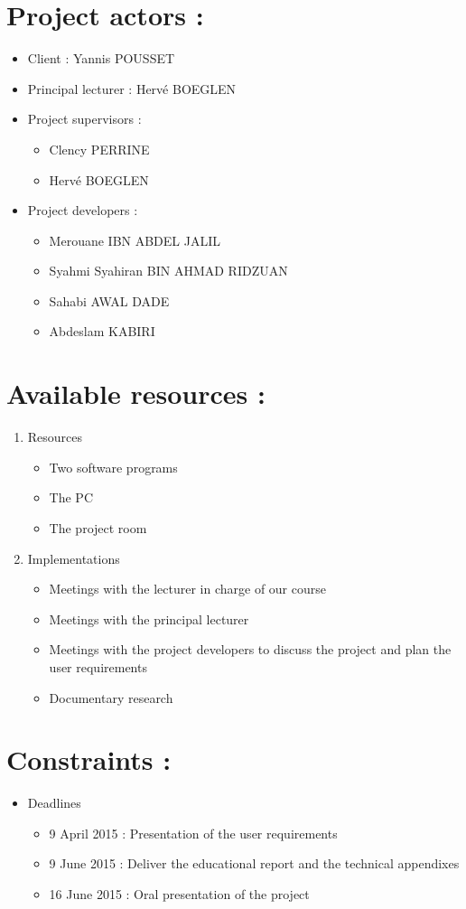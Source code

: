 \documentclass[12pt,a4paper]{article}
\begin{document}
\section{Project actors :}
\begin{itemize}
\item Client : Yannis POUSSET
\item Principal lecturer : Herv\'e BOEGLEN
\item Project supervisors :
	\begin{itemize}
	\item Clency PERRINE 
	\item Herv\'e BOEGLEN 
	\end{itemize}
\item Project developers : 
	\begin{itemize}
	\item Merouane IBN ABDEL JALIL   
	\item Syahmi Syahiran BIN AHMAD RIDZUAN 
	\item Sahabi AWAL DADE 
	\item Abdeslam KABIRI 
	\end{itemize}
\end{itemize}


\section{Available resources :}
\begin{enumerate}
\item Resources
\begin{itemize}
	\item Two software programs  
	\item The PC
	\item The project room
\end{itemize}
\item Implementations
\begin{itemize}
	\item Meetings with the lecturer in charge of our course  
	\item Meetings with the principal lecturer
	\item Meetings with the project developers to discuss the project and plan the user requirements
	\item Documentary research
\end{itemize}
\end{enumerate}

\section{Constraints :}
\begin{itemize}
\item Deadlines
	\begin{itemize}
		\item 9 April 2015 : Presentation of the user requirements  
		\item 9 June 2015 : Deliver the educational report and the technical appendixes
		\item 16 June 2015 : Oral presentation of the project
	\end{itemize}
\end{itemize}
\end{document}
